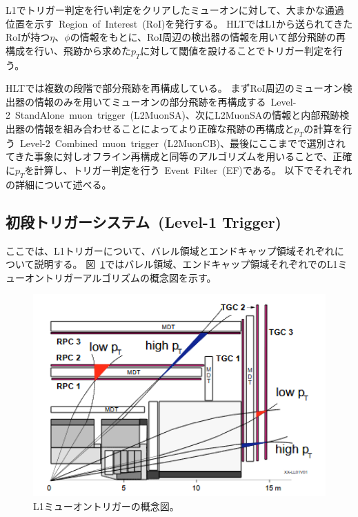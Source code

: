 L1でトリガー判定を行い判定をクリアしたミューオンに対して、大まかな通過位置を示す~Region~of~Interest~(RoI)を発行する。
HLTではL1から送られてきたRoIが持つ$\eta$、$\phi$の情報をもとに、RoI周辺の検出器の情報を用いて部分飛跡の再構成を行い、飛跡から求めた$p_T$に対して閾値を設けることでトリガー判定を行う。

HLTでは複数の段階で部分飛跡を再構成している。
まずRoI周辺のミューオン検出器の情報のみを用いてミューオンの部分飛跡を再構成する~Level-2~StandAlone~muon~trigger~(L2MuonSA)、次にL2MuonSAの情報と内部飛跡検出器の情報を組み合わせることによってより正確な飛跡の再構成と$p_T$の計算を行う~Level-2~Combined~muon~trigger~(L2MuonCB)、最後にここまでで選別されてきた事象に対しオフライン再構成と同等のアルゴリズムを用いることで、正確に$p_T$を計算し、トリガー判定を行う~Event~Filter~(EF)である。
以下でそれぞれの詳細について述べる。

\subsection{初段トリガーシステム~(Level-1 Trigger)}\label{chapter3-2-1}
ここでは、L1トリガーについて、バレル領域とエンドキャップ領域それぞれについて説明する。
図~\ref{fig:3-2}ではバレル領域、エンドキャップ領域それぞれでのL1ミューオントリガーアルゴリズムの概念図を示す。

\begin{figure}[h]
  \centering
  \includegraphics[clip, width=13cm]{fig/3/muon_trigger_overview.png}
  \caption{L1ミューオントリガーの概念図\cite{https://iopscience.iop.org/article/10.1088/1748-0221/4/04/P04010}。}
  \label{fig:3-2}
\end{figure}

